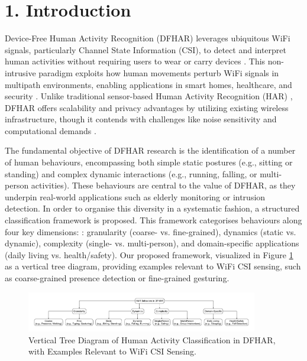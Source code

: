 \documentclass[Afour,sageh,times]{sagej}
\begin{document}
\maketitle


\section{1. Introduction}
\label{sec:introduction}

Device-Free Human Activity Recognition (DFHAR) leverages ubiquitous WiFi signals, particularly Channel State Information (CSI), to detect and interpret human activities without requiring users to wear or carry devices \citep{halperin2011tool, Arshad:2022_har_review}. This non-intrusive paradigm exploits how human movements perturb WiFi signals in multipath environments, enabling applications in smart homes, healthcare, and security \citep{guo2019robust, yang2022deep}. Unlike traditional sensor-based Human Activity Recognition (HAR) \citep{tavakkoli2024wavelet, fernandez2024wavelet}, DFHAR offers scalability and privacy advantages by utilizing existing wireless infrastructure, though it contends with challenges like noise sensitivity and computational demands \citep{yang2022deep, savvidou2024passive}.


The fundamental objective of DFHAR research is the identification of a number of human behaviours, encompassing both simple static postures (e.g., sitting or standing) and complex dynamic interactions (e.g., running, falling, or multi-person activities).  These behaviours are central to  the value of DFHAR, as they underpin real-world applications such as elderly monitoring or intrusion detection. In order to organise this diversity in a systematic fashion, a structured classification framework is proposed. This framework categorises behaviours along four key dimensions: : granularity (coarse- vs. fine-grained), dynamics (static vs. dynamic), complexity (single- vs. multi-person), and domain-specific applications (daily living vs. health/safety). 
Our proposed framework, visualized in Figure \ref{fig:behavior_classification} as a vertical tree diagram, providing examples relevant to WiFi CSI sensing, such as coarse-grained presence detection or fine-grained gesturing.

\begin{figure}[htbp]
\centering
\includegraphics[width=0.9\textwidth]{1.behavior_classification.pdf}  %
\caption{Vertical Tree Diagram of Human Activity Classification in DFHAR, with Examples Relevant to WiFi CSI Sensing.}
\label{fig:behavior_classification}
\end{figure}
\end{document}
